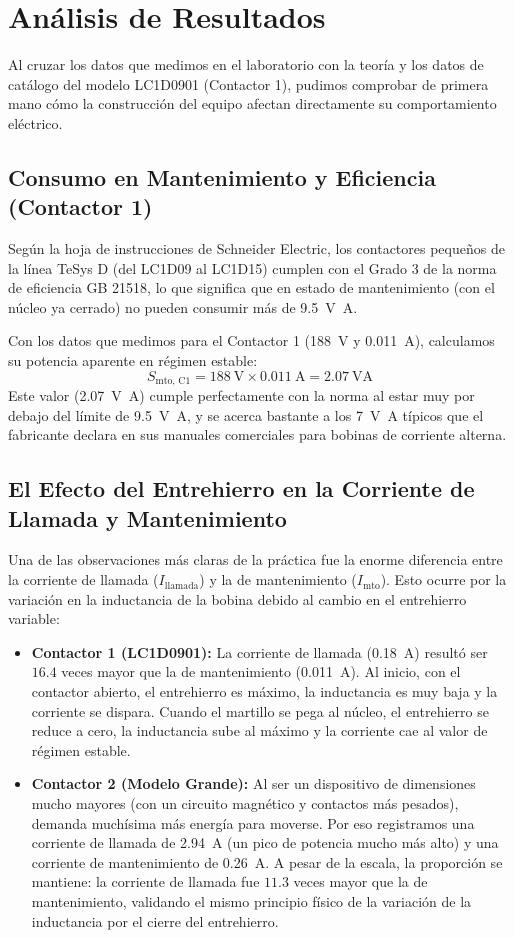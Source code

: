 \section{Análisis de Resultados}

Al cruzar los datos que medimos en el laboratorio con la teoría y los datos de catálogo del modelo LC1D0901 (Contactor 1), pudimos comprobar de primera mano cómo la construcción del equipo afectan directamente su comportamiento eléctrico.

\subsection{Consumo en Mantenimiento y Eficiencia (Contactor 1)}
Según la hoja de instrucciones de Schneider Electric, los contactores pequeños de la línea TeSys D (del LC1D09 al LC1D15) cumplen con el Grado 3 de la norma de eficiencia GB 21518, lo que significa que en estado de mantenimiento (con el núcleo ya cerrado) no pueden consumir más de \qty{9,5}{\volt\ampere}.

Con los datos que medimos para el Contactor 1 (\qty{188}{\volt} y \qty{0,011}{\ampere}), calculamos su potencia aparente en régimen estable:
\[ S_{\text{mto, C1}} = \qty{188}{\volt} \times \qty{0,011}{\ampere} = \qty{2,07}{\volt\ampere} \]
Este valor (\qty{2,07}{\volt\ampere}) cumple perfectamente con la norma al estar muy por debajo del límite de \qty{9,5}{\volt\ampere}, y se acerca bastante a los \qty{7}{\volt\ampere} típicos que el fabricante declara en sus manuales comerciales para bobinas de corriente alterna.
\subsection{El Efecto del Entrehierro en la Corriente de Llamada y Mantenimiento}
Una de las observaciones más claras de la práctica fue la enorme diferencia entre la corriente de llamada ($I_{\text{llamada}}$) y la de mantenimiento ($I_{\text{mto}}$). Esto ocurre por la variación en la inductancia de la bobina debido al cambio en el entrehierro variable:
\begin{itemize}
    \item \textbf{Contactor 1 (LC1D0901):} La corriente de llamada (\qty{0,18}{\ampere}) resultó ser $\num{16,4}$ veces mayor que la de mantenimiento (\qty{0,011}{\ampere}). Al inicio, con el contactor abierto, el entrehierro es máximo, la inductancia es muy baja y la corriente se dispara. Cuando el martillo se pega al núcleo, el entrehierro se reduce a cero, la inductancia sube al máximo y la corriente cae al valor de régimen estable.
    \item \textbf{Contactor 2 (Modelo Grande):} Al ser un dispositivo de dimensiones mucho mayores (con un circuito magnético y contactos más pesados), demanda muchísima más energía para moverse. Por eso registramos una corriente de llamada de \qty{2,94}{\ampere} (un pico de potencia mucho más alto) y una corriente de mantenimiento de \qty{0,26}{\ampere}. A pesar de la escala, la proporción se mantiene: la corriente de llamada fue $\num{11,3}$ veces mayor que la de mantenimiento, validando el mismo principio físico de la variación de la inductancia por el cierre del entrehierro.
\end{itemize}

